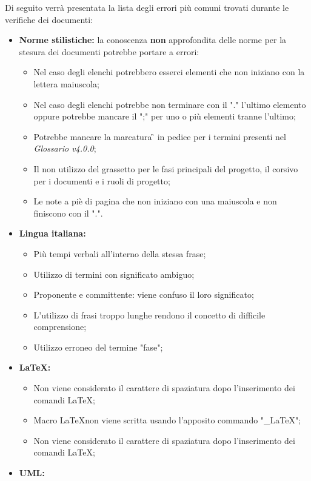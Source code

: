 Di seguito verrà presentata la lista degli errori più comuni trovati durante le verifiche dei documenti:
\begin{itemize}
	\item \textbf{Norme stilistiche:} la conoscenza \textbf{non} approfondita delle norme per la stesura dei documenti potrebbe portare a errori:
		\begin{itemize}
			\item Nel caso degli elenchi potrebbero esserci elementi che non iniziano con la lettera maiuscola;
			\item Nel caso degli elenchi potrebbe non terminare con il "." l'ultimo elemento oppure potrebbe mancare il ";" per uno o più elementi tranne l'ultimo; 
			\item Potrebbe mancare la marcatura \G{} in pedice per i termini presenti nel \textit{Glossario v4.0.0};
			\item Il non utilizzo del grassetto per le fasi principali del progetto, il corsivo per i documenti e i ruoli di progetto;
			\item Le note a piè di pagina che non iniziano con una maiuscola e non finiscono con il ".".
		\end{itemize}
	\item \textbf{Lingua italiana:} 
		\begin{itemize}
			\item Più tempi verbali all'interno della stessa frase;
			\item Utilizzo di termini con significato ambiguo;
			\item Proponente e committente: viene confuso il loro significato;
			\item L'utilizzo di frasi troppo lunghe rendono il concetto di difficile comprensione;
			\item Utilizzo erroneo del termine "fase";
		\end{itemize}
	\item \textbf{\LaTeX:}
	\begin{itemize}
			\item Non viene considerato il carattere di spaziatura dopo l'inserimento dei  comandi \LaTeX;
			\item Macro \LaTeX non viene scritta usando l'apposito commando "\_LaTeX";
			\item Non viene considerato il carattere di spaziatura dopo l'inserimento dei  comandi \LaTeX;
	\end{itemize}
	\item \textbf{UML:}
	\begin{itemize}

\end{itemize}
\end{itemize}
